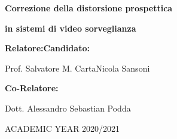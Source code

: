 \vspace{7em}

\noindent
\begin{center}
    \textbf{\Large Correzione della distorsione prospettica}\par
    \vspace{0.6em}
    \textbf{\Large in sistemi di video sorveglianza}\par
\end{center}{\LARGE \par}

\vspace{4cm}
\textbf{\large Relatore:}{\large \hfill{}}\textbf{\large Candidato:}{\large \par}

{\large Prof. Salvatore M. Carta\hfill{}Nicola Sansoni~}{\large \par}
\vspace{1cm}
\textbf{\large Co-Relatore:}{\large \par}
{\large Dott. Alessandro Sebastian Podda}

\vspace{2cm}

\begin{center}
    {\large ACADEMIC YEAR 2020/2021}{\large \par}
\end{center}
